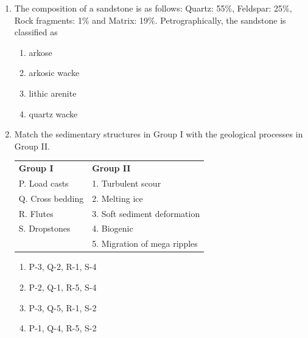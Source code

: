 \documentclass[journal,12pt,onecolumn]{IEEEtran}
\theoremstyle{remark}
\begin{document}
\begin{enumerate}
    \hfill{}
    
    \begin{multicols}{2}
        \begin{enumerate}
            \item normal faults
            \item reverse faults
            \item strike-slip faults
            \item transform faults
        \end{enumerate}
    \end{multicols}

    \item The composition of a sandstone is as follows: Quartz: 55\%, Feldspar: 25\%, Rock fragments: 1\% and Matrix: 19\%. Petrographically, the sandstone is classified as

    \hfill{}
    
    \begin{multicols}{2}
        \begin{enumerate}
            \item arkose
            \item arkosic wacke
            \item lithic arenite
            \item quartz wacke
        \end{enumerate}
    \end{multicols}

    \item Match the sedimentary structures in Group I with the geological processes in Group II.

    \hfill{}
    
    \begin{tabular}{ll}
        \textbf{Group I} & \textbf{Group II} \\
        P. Load casts & 1. Turbulent scour \\
        Q. Cross bedding & 2. Melting ice \\
        R. Flutes & 3. Soft sediment deformation \\
        S. Dropstones & 4. Biogenic \\
        & 5. Migration of mega ripples \\
    \end{tabular}
    
    \begin{multicols}{2}
        \begin{enumerate}
            \item P-3, Q-2, R-1, S-4
            \item P-2, Q-1, R-5, S-4
            \item P-3, Q-5, R-1, S-2
            \item P-1, Q-4, R-5, S-2
        \end{enumerate}
    \end{multicols}


\end{enumerate}
\end{document}

